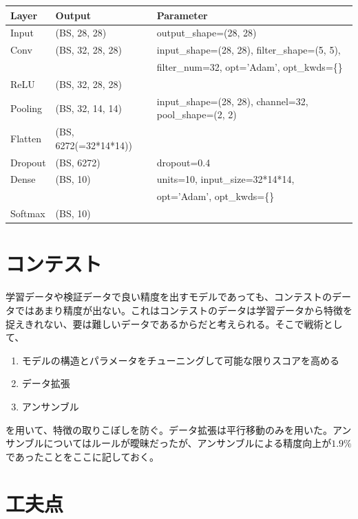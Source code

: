 \documentclass[platex,dvipdfmx]{jsarticle}
\begin{document}
\begin{table}[H]
  \begin{tabular}{lll}
    \hline
    Layer & Output & Parameter \\
    \hline \hline
    Input & (BS, 28, 28) & output\_shape=(28, 28) \\
    \hline
    Conv & (BS, 32, 28, 28) & input\_shape=(28, 28), filter\_shape=(5, 5), \\
    & & filter\_num=32, opt='Adam', opt\_kwds=\{\} \\
    \hline
    ReLU & (BS, 32, 28, 28)  \\
    \hline
    Pooling & (BS, 32, 14, 14) & input\_shape=(28, 28), channel=32, pool\_shape=(2, 2) \\
    \hline
    Flatten & (BS, 6272(=32*14*14)) \\
    \hline
    Dropout & (BS, 6272) & dropout=0.4 \\
    \hline
    Dense & (BS, 10) & units=10, input\_size=32*14*14, \\
    & & opt='Adam', opt\_kwds=\{\} \\
    \hline
    Softmax & (BS, 10) \\
    \hline
  \end{tabular}
\end{table}

\section{コンテスト}

学習データや検証データで良い精度を出すモデルであっても、コンテストのデータではあまり精度が出ない。これはコンテストのデータは学習データから特徴を捉えきれない、要は難しいデータであるからだと考えられる。そこで戦術として、

\begin{enumerate}
  \item モデルの構造とパラメータをチューニングして可能な限りスコアを高める
  \item データ拡張
  \item アンサンブル
\end{enumerate}

を用いて、特徴の取りこぼしを防ぐ。データ拡張は平行移動のみを用いた。アンサンブルについてはルールが曖昧だったが、アンサンブルによる精度向上が$1.9\%$であったことをここに記しておく。

\section{工夫点}
\end{document}
